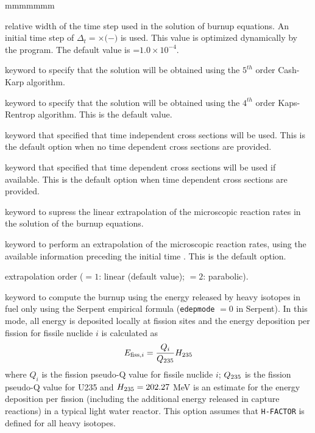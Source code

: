 \begin{ListeDeDescription}{mmmmmmm}
\item[\dusa{valh1}] relative width of the time step used in the solution of
burnup equations. An initial time step of 
$\Delta_{t}=$$\times ($$-$$)$ 
is used. This value is optimized dynamically by the program. The
default value is =$1.0\times 10^{-4}$.

\item[\moc{RUNG}] keyword to specify that the solution will be obtained using
the $5^{th}$ order Cash-Karp algorithm.

\item[\moc{KAPS}] keyword to specify that the solution will be obtained using
the $4^{th}$ order Kaps-Rentrop algorithm. This is the default value.

\item[\moc{TIXS}] keyword that specified that time independent cross sections will be used.
This is the default option when no time dependent cross sections are provided.

\item[\moc{TDXS}] keyword that specified that time dependent cross sections will be used if available.
This is the default option when time dependent cross sections are provided.

\item[\moc{NOEX}] keyword to supress the linear extrapolation of the
microscopic reaction rates in
the solution of the burnup equations.

\item[\moc{EXTR}] keyword to perform an extrapolation of the microscopic reaction rates, using
the available information preceding the initial time . This is the
default option.

\item[\dusa{iextr}] extrapolation order ($=1$: linear (default value); $=2$: parabolic).

\item[\moc{EDP0}] keyword to compute the burnup using the energy released by heavy isotopes in
fuel only using the Serpent empirical formula ({\tt edepmode} $= 0$ in Serpent).\cite{edep}
In this mode, all energy is deposited locally at fission sites and the energy deposition per
fission for fissile nuclide $i$ is calculated as
$$E_{{\rm fiss},i}={Q_i \over Q_{\rm 235}} H_{\rm 235}$$
\noindent where $Q_i$ is the fission pseudo-Q value for fissile nuclide $i$; $Q_{\rm 235}$ is the fission
pseudo-Q value for U235 and $H_{\rm 235} = 202.27$ MeV is an estimate for the energy deposition per
fission (including the additional energy released in capture reactions) in a typical light water reactor. This option
assumes that {\tt H-FACTOR} is defined for all heavy isotopes.


\end{ListeDeDescription}
